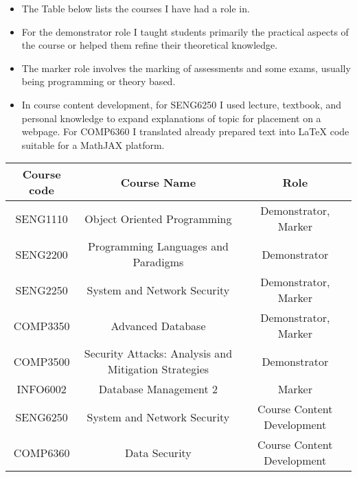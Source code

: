 \documentclass{myresume}
\begin{document}
            \begin{itemize}
                \item The Table below lists the courses I have had a role in.
                \item For the demonstrator role I taught students primarily the
                        practical aspects of the course or helped them refine
                            their theoretical knowledge.
                \item The marker role involves the marking of assessments and
                        some exams, usually being programming or theory based.
                \item In course content development, for SENG6250 I used lecture, textbook,
                        and personal knowledge to expand explanations of topic
                            for placement on a webpage. For COMP6360 I
                            translated already prepared text into LaTeX code
                            suitable for a MathJAX platform.
            \end{itemize}
        \begin{center}
        \begin{tabular}{| c | c | c |}
                \hline
                \textbf{Course code} & \textbf{Course Name} &
                \textbf{Role} \\
                \hline
                SENG1110 & Object Oriented Programming & Demonstrator, Marker \\
                \hline
                SENG2200 & Programming Languages and Paradigms & Demonstrator \\
                \hline
                SENG2250 & System and Network Security & Demonstrator, Marker \\
                \hline
                COMP3350 & Advanced Database & Demonstrator, Marker \\
                \hline
                COMP3500 & Security Attacks: Analysis and Mitigation Strategies & Demonstrator \\
                \hline
                INFO6002 & Database Management 2 & Marker \\
                \hline
                SENG6250 & System and Network Security & Course Content
                Development \\
                \hline
                COMP6360 & Data Security & Course Content Development \\
                \hline
        \end{tabular}
        \end{center}
\end{document}
